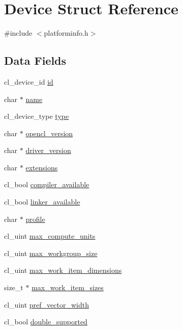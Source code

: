 \hypertarget{structDevice}{}\section{Device Struct Reference}
\label{structDevice}


{\ttfamily \#include $<$platforminfo.\+h$>$}

\subsection*{Data Fields}
\begin{DoxyCompactItemize}
\item 
cl\+\_\+device\+\_\+id \hyperlink{structDevice_ada94aa00c9ab31b8c55bc99061ebfef8}{id}
\item 
char $\ast$ \hyperlink{structDevice_a92d6cdb382fa19b62b961c3ae5288c0b}{name}
\item 
cl\+\_\+device\+\_\+type \hyperlink{structDevice_a4331ce8386201fca48db55cdbe39f94a}{type}
\item 
char $\ast$ \hyperlink{structDevice_a37d2eb2c36cde8a0d35a71ff1b7a9bda}{opencl\+\_\+version}
\item 
char $\ast$ \hyperlink{structDevice_a5b408b26ec962502516f7203a5514145}{driver\+\_\+version}
\item 
char $\ast$ \hyperlink{structDevice_a995dfe3e0fe13c14a3a24dc356ac5db6}{extensions}
\item 
cl\+\_\+bool \hyperlink{structDevice_a4b390bd981afb9c4a6f7f092227129a8}{compiler\+\_\+available}
\item 
cl\+\_\+bool \hyperlink{structDevice_a1edd7c1aaad269999262285f48f5b2a0}{linker\+\_\+available}
\item 
char $\ast$ \hyperlink{structDevice_a8c2887a2df95caba5235491cc8663435}{profile}
\item 
cl\+\_\+uint \hyperlink{structDevice_abb5d5b15973b9b3c64ffe711eefb616c}{max\+\_\+compute\+\_\+units}
\item 
cl\+\_\+uint \hyperlink{structDevice_a6381a5acdd8f3568d1ac6d503ae746d1}{max\+\_\+workgroup\+\_\+size}
\item 
cl\+\_\+uint \hyperlink{structDevice_ad243dd6f35a41309e3856dbb21b7ebf3}{max\+\_\+work\+\_\+item\+\_\+dimensions}
\item 
size\+\_\+t $\ast$ \hyperlink{structDevice_ab86202efb1214bac90b62246ab6dcad2}{max\+\_\+work\+\_\+item\+\_\+sizes}
\item 
cl\+\_\+uint \hyperlink{structDevice_a0fcbcc0f92b61319434da1132cee7045}{pref\+\_\+vector\+\_\+width}
\item 
cl\+\_\+bool \hyperlink{structDevice_a6b660d2db60564f09a267686f3a46ee6}{double\+\_\+supported}
\end{DoxyCompactItemize}


